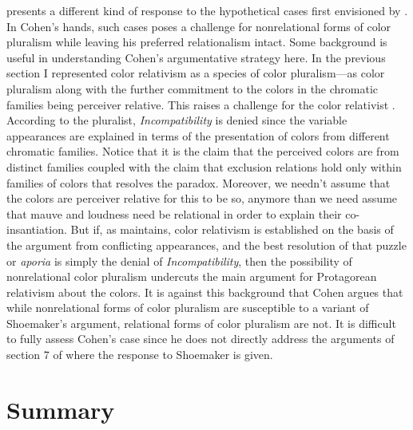 \documentclass[12pt]{article}
\begin{document}
\citet{Cohen:2009lq} presents a different kind of response to the hypothetical cases first envisioned by \citet{Shoemaker:2003wk}. In Cohen's hands, such cases poses a challenge for nonrelational forms of color pluralism while leaving his preferred relationalism intact. Some background is useful in understanding Cohen's argumentative strategy here. In the previous section I represented color relativism as a species of color pluralism---as color pluralism along with the further commitment to the colors in the chromatic families being perceiver relative. This raises a challenge for the color relativist \citep{Kalderon:2006tg}. According to the pluralist, \emph{Incompatibility} is denied since the variable appearances are explained in terms of the presentation of colors from different chromatic families. Notice that it is the claim that the perceived colors are from distinct families coupled with the claim that exclusion relations hold only within families of colors that resolves the paradox. Moreover, we needn't assume that the colors are perceiver relative for this to be so, anymore than we need assume that mauve and loudness need be relational in order to explain their co-insantiation. But if, as \citet{Cohen:2009lq} maintains, color relativism is established on the basis of the argument from conflicting appearances, and the best resolution of that puzzle or \emph{aporia} is simply the denial of \emph{Incompatibility}, then the possibility of nonrelational color pluralism undercuts the main argument for Protagorean relativism about the colors. It is against this background that Cohen argues that while nonrelational forms of color pluralism are susceptible to a variant of Shoemaker's argument, relational forms of color pluralism are not. It is difficult to fully assess Cohen's case since he does not directly address the arguments of section 7 of \citet{Kalderon:2007mr} where the response to Shoemaker is given.


\section{Summary} %
\label{sec:summary}
\end{document}

